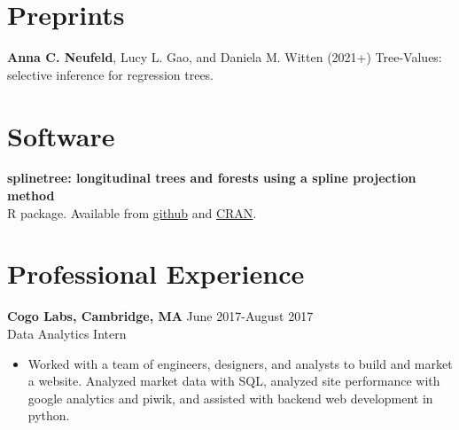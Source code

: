 \documentclass[margin, 10pt]{res} %
\begin{document}
\begin{resume}
{\section{Preprints} 
\textbf{Anna C. Neufeld}, Lucy L. Gao, and Daniela M. Witten (2021+) Tree-Values: selective inference for regression trees.



\section{Software} 
\textbf{splinetree: longitudinal trees and forests using a spline projection method} \\
R package. Available from \href{https://github.com/anna-neufeld/splinetree}{github} and \href{https://cran.r-project.org/web/packages/splinetree/index.html}{CRAN}. 

\section{Professional Experience}
{\textbf{Cogo Labs, Cambridge, MA}} \hfill June 2017-August 2017 \\
Data Analytics Intern
\begin{itemize}
\item Worked with a team of engineers, designers, and analysts to build and market a website. Analyzed market data with SQL, analyzed site performance with google analytics and piwik, and assisted with backend web development in python. 
\end{itemize}



}
\end{resume}
\end{document}
